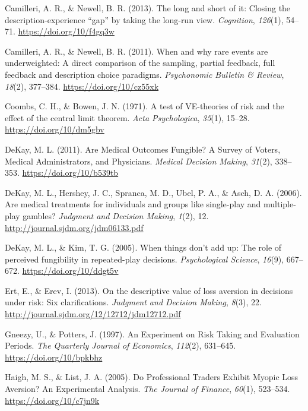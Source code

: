 \documentclass[
  english,
  man, donotrepeattitle,floatsintext]{apa7}
\newlength{\cslhangindent}
\newenvironment{cslreferences}%
  {\setlength{\parindent}{0pt}%
  \everypar{\setlength{\hangindent}{\cslhangindent}}\ignorespaces}%
  {\par}
\theoremstyle{definition}
\theoremstyle{definition}
\theoremstyle{definition}
\theoremstyle{definition}
\theoremstyle{remark}
\begin{document}
\begin{cslreferences}
\leavevmode\hypertarget{ref-camilleri2013}{}%
Camilleri, A. R., \& Newell, B. R. (2013). The long and short of it: Closing the description-experience ``gap'' by taking the long-run view. \emph{Cognition}, \emph{126}(1), 54--71. \url{https://doi.org/10/f4gq3w}

\leavevmode\hypertarget{ref-camilleri2011}{}%
Camilleri, A. R., \& Newell, B. R. (2011). When and why rare events are underweighted: A direct comparison of the sampling, partial feedback, full feedback and description choice paradigms. \emph{Psychonomic Bulletin \& Review}, \emph{18}(2), 377--384. \url{https://doi.org/10/cz55xk}

\leavevmode\hypertarget{ref-coombs1971}{}%
Coombs, C. H., \& Bowen, J. N. (1971). A test of VE-theories of risk and the effect of the central limit theorem. \emph{Acta Psychologica}, \emph{35}(1), 15--28. \url{https://doi.org/10/dm5gbv}

\leavevmode\hypertarget{ref-dekay2011}{}%
DeKay, M. L. (2011). Are Medical Outcomes Fungible? A Survey of Voters, Medical Administrators, and Physicians. \emph{Medical Decision Making}, \emph{31}(2), 338--353. \url{https://doi.org/10/b539tb}

\leavevmode\hypertarget{ref-dekay2006}{}%
DeKay, M. L., Hershey, J. C., Spranca, M. D., Ubel, P. A., \& Asch, D. A. (2006). Are medical treatments for individuals and groups like single-play and multiple-play gambles? \emph{Judgment and Decision Making}, \emph{1}(2), 12. \url{http://journal.sjdm.org/jdm06133.pdf}

\leavevmode\hypertarget{ref-dekay2005}{}%
DeKay, M. L., \& Kim, T. G. (2005). When things don't add up: The role of perceived fungibility in repeated-play decisions. \emph{Psychological Science}, \emph{16}(9), 667--672. \url{https://doi.org/10/ddgt5v}

\leavevmode\hypertarget{ref-ert2013}{}%
Ert, E., \& Erev, I. (2013). On the descriptive value of loss aversion in decisions under risk: Six clarifications. \emph{Judgment and Decision Making}, \emph{8}(3), 22. \url{http://journal.sjdm.org/12/12712/jdm12712.pdf}

\leavevmode\hypertarget{ref-gneezy1997}{}%
Gneezy, U., \& Potters, J. (1997). An Experiment on Risk Taking and Evaluation Periods. \emph{The Quarterly Journal of Economics}, \emph{112}(2), 631--645. \url{https://doi.org/10/bpkbhz}

\leavevmode\hypertarget{ref-haigh2005}{}%
Haigh, M. S., \& List, J. A. (2005). Do Professional Traders Exhibit Myopic Loss Aversion? An Experimental Analysis. \emph{The Journal of Finance}, \emph{60}(1), 523--534. \url{https://doi.org/10/c7jn9k}


\end{cslreferences}
\end{document}
